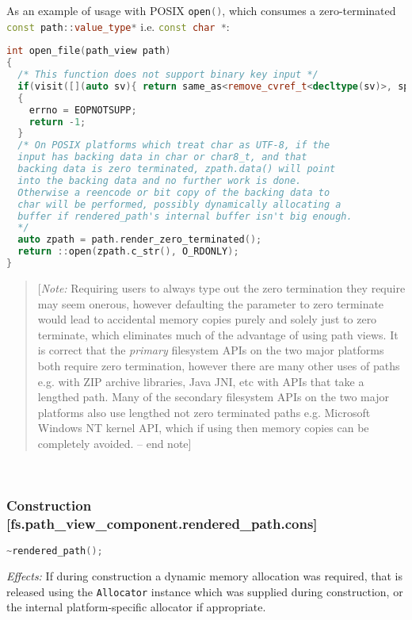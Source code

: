 \documentclass[11pt]{article}
\newcommand{\code}[2][cpp]{\lstinline[language=#1,basicstyle=\small\ttfamily]{#2}}
\newcommand{\desc}[1]{\textit{#1}}
\newcommand{\effects}{\desc{Effects: }}
\newcommand{\note}[1]{\begin{quote}[\textit{Note:} #1 -- end note]\end{quote}}
\begin{document}
As an example of usage with POSIX \code{open()}, which consumes a zero-terminated \code{const path::value_type*} i.e. \code{const char *}:

\begin{lstlisting}[language=cpp]
int open_file(path_view path)
{
  /* This function does not support binary key input */
  if(visit([](auto sv){ return same_as<remove_cvref_t<decltype(sv)>, span<const byte>>; }, path))
  {
    errno = EOPNOTSUPP;
    return -1;
  }
  /* On POSIX platforms which treat char as UTF-8, if the
  input has backing data in char or char8_t, and that
  backing data is zero terminated, zpath.data() will point
  into the backing data and no further work is done.
  Otherwise a reencode or bit copy of the backing data to
  char will be performed, possibly dynamically allocating a
  buffer if rendered_path's internal buffer isn't big enough.
  */
  auto zpath = path.render_zero_terminated();
  return ::open(zpath.c_str(), O_RDONLY);
}
\end{lstlisting}

\color{black}

\note{Requiring users to always type out the zero termination they require may seem onerous, however defaulting the parameter to zero terminate would lead to accidental memory copies purely and solely just to zero terminate, which eliminates much of the advantage of using path views. It is correct that the \emph{primary} filesystem APIs on the two major platforms both require zero termination, however there are many other uses of paths e.g. with ZIP archive libraries, Java JNI, etc with APIs that take a lengthed path. Many of the secondary filesystem APIs on the two major platforms also use lengthed not zero terminated paths e.g. Microsoft Windows NT kernel API, which if using then memory copies can be completely avoided.}

\color{darkgreen}

~ \\

\subsubsection*{Construction [fs.path\_view\_component.rendered\_path.cons]}

\begin{lstlisting}[language=cpp]
    ~rendered_path();
\end{lstlisting}

\effects If during construction a dynamic memory allocation was required, that is released using the \code{Allocator} instance which was supplied during construction, or the internal platform-specific allocator if appropriate.\\
\end{document}
